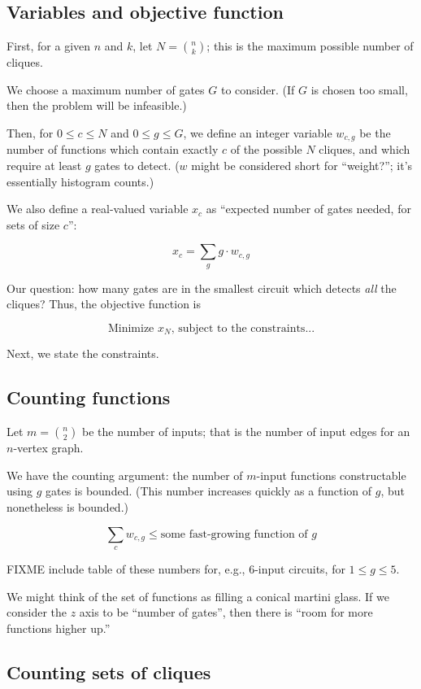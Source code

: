 \documentclass[12pt]{article}
\theoremstyle{definition}
\begin{document}
\subsection{Variables and objective function}

First, for a given $n$ and $k$, let $N = {n \choose k}$; this is
the maximum possible number of cliques.

We choose a maximum number of gates $G$ to consider. (If $G$ is
chosen too small, then the problem will be infeasible.)

Then, for $0 \le c \le N$ and $0 \le g \le G$,
we define an integer variable $w_{c,g}$ be the number of functions which contain
exactly $c$ of the possible $N$ cliques, and which require at least
$g$ gates to detect. ($w$ might be considered short for ``weight?'';
it's essentially histogram counts.)

We also define a real-valued variable
$x_c$ as ``expected number of gates needed, for sets of size $c$'':

\[
x_c = \sum_g g \cdot w_{c,g}
\]

Our question: how many gates are in the smallest circuit
which detects {\em all} the cliques? Thus, the objective function
is

\[
\text{Minimize }x_N\text{, subject to the constraints...}
\]

Next, we state the constraints.

\subsection{Counting functions}

Let $m = {n \choose 2}$ be the number of inputs; that is the number
of input edges for an $n$-vertex graph.

We have the counting argument: the number of $m$-input functions
constructable using $g$ gates is bounded. (This number increases
quickly as a function of $g$, but nonetheless is bounded.)

\[
\sum_c w_{c,g} \le \text{some fast-growing function of }g
\]

FIXME include table of these numbers for, e.g., 6-input circuits,
for $1 \le g \le 5$.

We might think of the set of functions as filling a conical
martini glass. If we consider the $z$ axis to be ``number of gates'',
then there is ``room for more functions higher up.''

\subsection{Counting sets of cliques}
\end{document}
